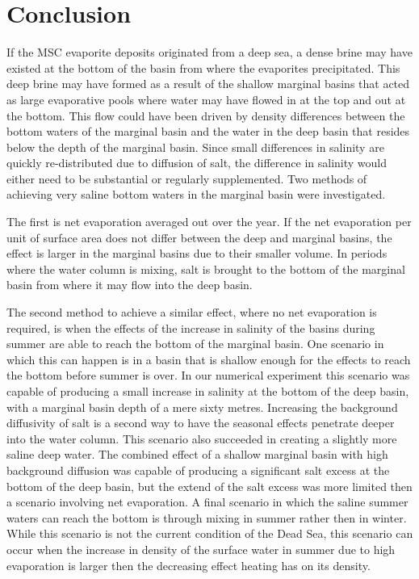 \documentclass[twocolumn]{article}
\begin{document}
\section{Conclusion}
If the MSC evaporite deposits originated from a deep sea, a dense brine may have existed at the bottom of the basin from where the evaporites precipitated. This deep brine may have formed as a result of the shallow marginal basins that acted as large evaporative pools where water may have flowed in at the top and out at the bottom. This flow could have been driven by density differences between the bottom waters of the marginal basin and the water in the deep basin that resides below the depth of the marginal basin. Since small differences in salinity are quickly re-distributed due to diffusion of salt, the difference in salinity would either need to be substantial or regularly supplemented. Two methods of achieving very saline bottom waters in the marginal basin were investigated. 

The first is net evaporation averaged out over the year. If the net evaporation per unit of surface area does not differ between the deep and marginal basins, the effect is larger in the marginal basins due to their smaller volume. In periods where the water column is mixing, salt is brought to the bottom of the marginal basin from where it may flow into the deep basin. 

The second method to achieve a similar effect, where no net evaporation is required, is when the effects of the increase in salinity of the basins during summer are able to reach the bottom of the marginal basin. One scenario in which this can happen is in a basin that is shallow enough for the effects to reach the bottom before summer is over. In our numerical experiment this scenario was capable of producing a small increase in salinity at the bottom of the deep basin, with a marginal basin depth of a mere sixty metres. Increasing the background diffusivity of salt is a second way to have the seasonal effects penetrate deeper into the water column. This scenario also succeeded in creating a slightly more saline deep water. The combined effect of a shallow marginal basin with high background diffusion was capable of producing a significant salt excess at the bottom of the deep basin, but the extend of the salt excess was more limited then a scenario involving net evaporation. 
A final scenario in which the saline summer waters can reach the bottom is through mixing in summer rather then in winter. While this scenario is not the current condition of the Dead Sea, this scenario can occur when the increase in density of the surface water in summer due to high evaporation is larger then the decreasing effect heating has on its density.
\end{document}
